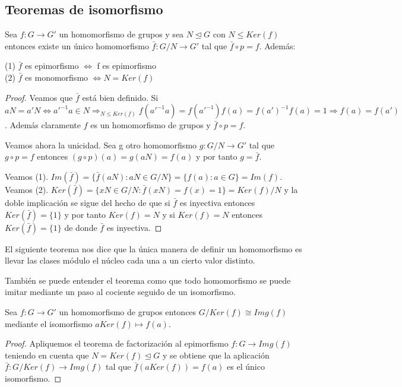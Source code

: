 \subsection{Teoremas de isomorfismo}

\begin{proposition}
Sea $f:G \rightarrow G'$ un homomorfismo de grupos y sea $N \trianglelefteq G$ con $N \le Ker(f)$ entonces existe un único homomorfismo $\bar{f}:G/N \rightarrow G'$ tal que $\bar{f} \circ p = f$. Además:

(1) $\bar{f}$ es epimorfismo $\iff$ f es epimorfismo \\
(2) $\bar{f}$ es monomorfismo $\iff N = Ker(f)$
\end{proposition}
\begin{proof}
Veamos que $\bar{f}$ está bien definido. Si $aN = a'N \iff a'^{-1}a \in N \Rightarrow_{N \le Ker(f)} f(a'^{-1}a) = f(a'^{-1})f(a) = f(a')^{-1}f(a) = 1 \Rightarrow f(a) = f(a')$. Además claramente $f$ es un homomorfismo de grupos y $\bar{f} \circ p = f$.

Veamos ahora la unicidad. Sea g otro homomorfismo $g:G/N \rightarrow G'$ tal que $g \circ p = f$ entonces $(g \circ p)(a) = g(aN) = f(a)$ y por tanto $g = \bar{f}$.

Veamos (1). $Im(\bar{f}) = \{\bar{f}(aN):aN \in G/N\} = \{f(a):a \in G\} = Im(f)$. \\
Veamos (2). $Ker(\bar{f}) = \{xN \in G/N :\bar{f}(xN) = f(x) = 1\} =  Ker(f)/N$ y la doble implicación se sigue del hecho de que si $\bar{f}$ es inyectiva entonces $Ker(\bar{f}) = \{1\}$ y por tanto $Ker(f) = N$ y si $Ker(f) = N$ entonces $Ker(\bar{f}) = \{1\}$ de donde $\bar{f}$ es inyectiva.
\end{proof}

El siguiente teorema nos dice que la única manera de definir un homomorfismo es llevar las clases módulo el núcleo cada una a un cierto valor distinto. 

También se puede entender el teorema como que todo homomorfismo se puede imitar mediante un paso al cociente seguido de un isomorfismo. 

\begin{theorem}
Sea $f:G \rightarrow G'$ un homomorfismo de grupos entonces $G/Ker(f) \cong Img(f)$ mediante el isomorfismo $aKer(f) \mapsto f(a)$.
\end{theorem}
\begin{proof}
Apliquemos el teorema de factorización al epimorfismo $f:G \rightarrow Img(f)$ teniendo en cuenta que $N=Ker(f) \trianglelefteq G$ y se obtiene que la aplicación $\bar{f}:G/Ker(f) \rightarrow Img(f)$ tal que $\bar{f}(aKer(f)) = f(a)$ es el único isomorfismo.
\end{proof}

